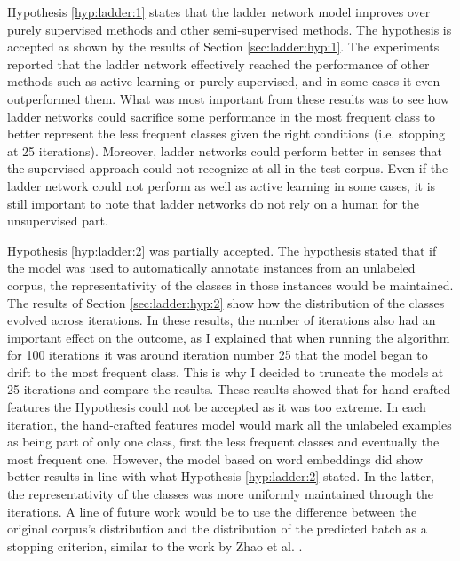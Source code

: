 Hypothesis \ref{hyp:ladder:1} states that the ladder network model improves
over purely supervised methods and other semi-supervised methods. The
hypothesis is accepted as shown by the results of Section
\ref{sec:ladder:hyp:1}. The experiments reported that the ladder network
effectively reached the performance of other methods such as active learning or
purely supervised, and in some cases it even outperformed them. What was most
important from these results was to see how ladder networks could sacrifice
some performance in the most frequent class to better represent the less
frequent classes given the right conditions (i.e. stopping at 25 iterations).
Moreover, ladder networks could perform better in senses that the supervised
approach could not recognize at all in the test corpus. Even if the ladder
network could not perform as well as active learning in some cases, it is still
important to note that ladder networks do not rely on a human for the
unsupervised part.

Hypothesis \ref{hyp:ladder:2} was partially accepted. The hypothesis stated
that if the model was used to automatically annotate instances from an
unlabeled corpus, the representativity of the classes in those instances would
be maintained. The results of Section \ref{sec:ladder:hyp:2} show how the
distribution of the classes evolved across iterations. In these results, the
number of iterations also had an important effect on the outcome, as I
explained that when running the algorithm for 100 iterations it was around
iteration number 25 that the model began to drift to the most frequent class.
This is why I decided to truncate the models at 25 iterations and compare the
results. These results showed that for hand-crafted features the Hypothesis
could not be accepted as it was too extreme. In each iteration, the
hand-crafted features model would mark all the unlabeled examples as being part
of only one class, first the less frequent classes and eventually the most
frequent one. However, the model based on word embeddings did show better
results in line with what Hypothesis \ref{hyp:ladder:2} stated. In the latter,
the representativity of the classes was more uniformly maintained through the
iterations. A line of future work would be to use the difference between the
original corpus's distribution and the distribution of the predicted batch
as a stopping criterion, similar to the work by Zhao et al. \cite{Zhao:2017aa}.

